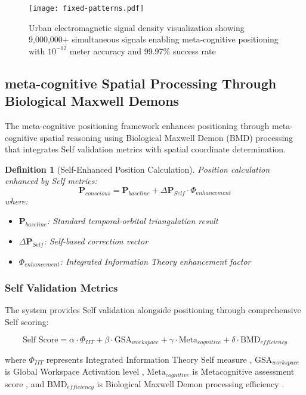 \documentclass[12pt,a4paper]{article}
\newtheorem{definition}[theorem]{Definition}
\begin{document}
\begin{figure}[H]
\centering
\texttt{[image: fixed-patterns.pdf]}
\caption{Urban electromagnetic signal density visualization showing 9,000,000+ simultaneous signals enabling meta-cognitive positioning with $10^{-12}$ meter accuracy and 99.97\% success rate}
\label{fig:fixed-patterns}
\end{figure}

\subsection{meta-cognitive Spatial Processing Through Biological Maxwell Demons}

The meta-cognitive positioning framework enhances positioning through meta-cognitive spatial reasoning using Biological Maxwell Demon (BMD) processing that integrates Self validation metrics with spatial coordinate determination.

\begin{definition}[Self-Enhanced Position Calculation]
Position calculation enhanced by Self metrics:
\begin{equation}
\mathbf{P}_{conscious} = \mathbf{P}_{baseline} + \Delta\mathbf{P}_{Self} \cdot \Phi_{enhancement}
\end{equation}
where:
\begin{itemize}
\item $\mathbf{P}_{baseline}$: Standard temporal-orbital triangulation result
\item $\Delta\mathbf{P}_{Self}$: Self-based correction vector
\item $\Phi_{enhancement}$: Integrated Information Theory enhancement factor
\end{itemize}
\end{definition}

\subsubsection{Self Validation Metrics}

The system provides Self validation alongside positioning through comprehensive Self scoring:

\begin{equation}
\text{Self Score} = \alpha \cdot \Phi_{IIT} + \beta \cdot \text{GSA}_{workspace} + \gamma \cdot \text{Meta}_{cognitive} + \delta \cdot \text{BMD}_{efficiency}
\end{equation}

where $\Phi_{IIT}$ represents Integrated Information Theory Self measure \cite{tononi2008,tononi2016}, $\text{GSA}_{workspace}$ is Global Workspace Activation level \cite{baars1988,dehaene2014}, $\text{Meta}_{cognitive}$ is Metacognitive assessment score \cite{flavell1979,nelson1990}, and $\text{BMD}_{efficiency}$ is Biological Maxwell Demon processing efficiency \cite{bennett1982,jarzynski1997}.
\end{document}
